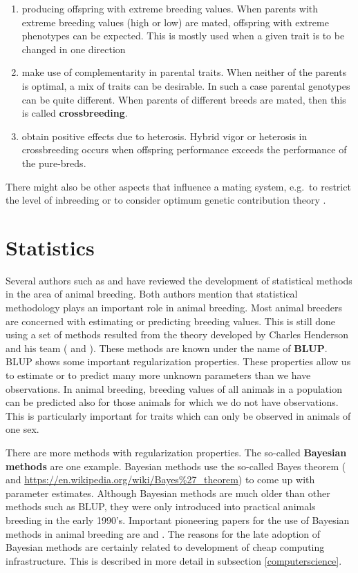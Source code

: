 \documentclass[
]{book}
\providecommand{\tightlist}{%
  \setlength{\itemsep}{0pt}\setlength{\parskip}{0pt}}
\theoremstyle{definition}
\theoremstyle{definition}
\theoremstyle{definition}
\theoremstyle{remark}
\begin{document}
\begin{enumerate}
\def\labelenumi{\arabic{enumi}.}
\tightlist
\item
  producing offspring with extreme breeding values. When parents with extreme breeding values (high or low) are mated, offspring with extreme phenotypes can be expected. This is mostly used when a given trait is to be changed in one direction
\item
  make use of complementarity in parental traits. When neither of the parents is optimal, a mix of traits can be desirable. In such a case parental genotypes can be quite different. When parents of different breeds are mated, then this is called \textbf{crossbreeding}.
\item
  obtain positive effects due to heterosis. Hybrid vigor or heterosis in crossbreeding occurs when offspring performance exceeds the performance of the pure-breds.
\end{enumerate}

There might also be other aspects that influence a mating system, e.g.~to restrict the level of inbreeding or to consider optimum genetic contribution theory \citep{Meuwissen1997}.

\hypertarget{statistics}{%
\section{Statistics}\label{statistics}}

Several authors such as \citep{Schaeffer2013} and \citep{Gianola2015} have reviewed the development of statistical methods in the area of animal breeding. Both authors mention that statistical methodology plays an important role in animal breeding. Most animal breeders are concerned with estimating or predicting breeding values. This is still done using a set of methods resulted from the theory developed by Charles Henderson and his team (\citep{Henderson1953} and \citep{Henderson1975}). These methods are known under the name of \textbf{BLUP}. BLUP shows some important regularization properties. These properties allow us to estimate or to predict many more unknown parameters than we have observations. In animal breeding, breeding values of all animals in a population can be predicted also for those animals for which we do not have observations. This is particularly important for traits which can only be observed in animals of one sex.

There are more methods with regularization properties. The so-called \textbf{Bayesian methods} are one example. Bayesian methods use the so-called Bayes theorem (\citep{Bayes1763} and \url{https://en.wikipedia.org/wiki/Bayes\%27_theorem}) to come up with parameter estimates. Although Bayesian methods are much older than other methods such as BLUP, they were only introduced into practical animals breeding in the early 1990's. Important pioneering papers for the use of Bayesian methods in animal breeding are \citep{Gianola1982} and \citep{Gianola1986}. The reasons for the late adoption of Bayesian methods are certainly related to development of cheap computing infrastructure. This is described in more detail in subsection \ref{computerscience}.
\end{document}
